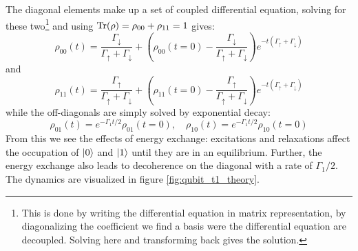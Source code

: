 The diagonal elements make up a set of coupled differential equation, solving for these two\footnote{This is done by writing the differential equation in matrix representation, by diagonalizing the coefficient we find a basis were the differential equation are decoupled. Solving here and transforming back gives the solution. }  and using $\Tr(\rho) = \rho_{00} + \rho_{11} = 1$ gives:
\begin{equation}
\rho_{00}(t) = \frac{\Gamma_\downarrow}{\Gamma_\uparrow + \Gamma_\downarrow} + \left(\rho_{00}(t=0) -  \frac{\Gamma_\downarrow}{\Gamma_\uparrow + \Gamma_\downarrow}\right)e^{-t(\Gamma_\uparrow + \Gamma_\downarrow)}
\end{equation}
and 
\begin{equation}    
\rho_{11}(t) = \frac{\Gamma_\uparrow}{\Gamma_\uparrow + \Gamma_\downarrow}+\left( \rho_{11}(t=0) -\frac{ \Gamma_\uparrow}{\Gamma_\uparrow + \Gamma_\downarrow}\right) e^{-t(\Gamma_\uparrow + \Gamma_\downarrow)}
\end{equation}
while the off-diagonals are simply solved by exponential decay:
\begin{equation}
    \rho_{01}(t) = e^{-\Gamma_1 t/2}\rho_{01}(t=0), \quad \rho_{10}(t) = e^{-\Gamma_1 t/2}\rho_{10}(t=0)
\end{equation}
From this we see the effects of energy exchange: excitations and relaxations affect the occupation of $\ket{0}$ and $\ket{1}$ until they are in an equilibrium. Further, the energy exchange also leads to decoherence on the diagonal with a rate of $\Gamma_1/2$. The dynamics are visualized in figure \ref{fig:qubit_t1_theory}.
